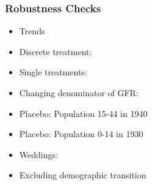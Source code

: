\documentclass[aspectratio=169]{beamer}
\begin{document}


\begin{frame}[label=RC]
\frametitle{Robustness Checks}
\begin{itemize}
    \item Trends %
    \hyperlink{trends_event}{}
\medskip
     \item Discrete treatment: %
     \hyperlink{median_event}{}
\medskip

     \item Single treatments: %
     \hyperlink{share_event}{} \hyperlink{teachers_event}{}
\

\medskip
     \item Changing denominator of GFR: %
     \hyperlink{base_mobile_event}{}
\medskip

\item Placebo: Population 15-44 in 1940 \hyperlink{placebo_1544}{}
\medskip

    \item Placebo: Population 0-14 in 1930 \hyperlink{placebo}{}
\medskip

    \item Weddings: %
    \hyperlink{eventstudy_weddings}{}
\medskip
\item Excluding demographic transition \hyperlink{tfr_back}{}
   
\end{itemize}
\end{frame}
\end{document}
